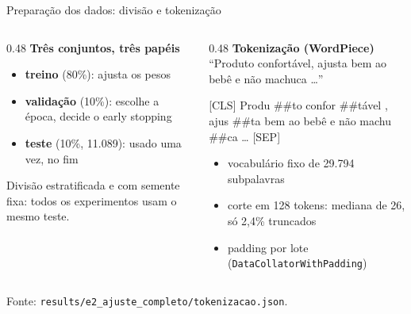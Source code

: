 \documentclass[aspectratio=169,10pt]{beamer}
\newcommand{\fonte}[1]{\par\vfill{\scriptsize\color{tinta2}Fonte: #1}}
\begin{document}
\begin{frame}[fragile]{Preparação dos dados: divisão e tokenização}
  \begin{columns}[T]
    \begin{column}{0.48\textwidth}
      \textbf{Três conjuntos, três papéis}
      \begin{itemize}
        \item \textbf{treino} (80\%): ajusta os pesos
        \item \textbf{validação} (10\%): escolhe a época, decide o early stopping
        \item \textbf{teste} (10\%, 11.089): usado uma vez, no fim
      \end{itemize}
      Divisão estratificada e com semente fixa: todos os experimentos usam o mesmo teste.
    \end{column}
    \begin{column}{0.48\textwidth}
      \textbf{Tokenização (WordPiece)}\\[2pt]
      \small ``Produto confortável, ajusta bem ao bebê e não machuca \dots''\\[4pt]
      {\raggedright\ttfamily\scriptsize
      \colorbox{azul!15}{[CLS]} Produ \colorbox{laranja!20}{\#\#to} confor \colorbox{laranja!20}{\#\#tável} , ajus \colorbox{laranja!20}{\#\#ta} bem ao bebê e não machu \colorbox{laranja!20}{\#\#ca} \dots{} \colorbox{azul!15}{[SEP]}\par}
      \begin{itemize}
        \item vocabulário fixo de 29.794 subpalavras
        \item corte em 128 tokens: mediana de 26, só 2,4\% truncados
        \item padding por lote (\texttt{DataCollatorWithPadding})
      \end{itemize}
    \end{column}
  \end{columns}
  \fonte{\texttt{results/e2\_ajuste\_completo/tokenizacao.json}.}
\end{frame}

\end{document}
